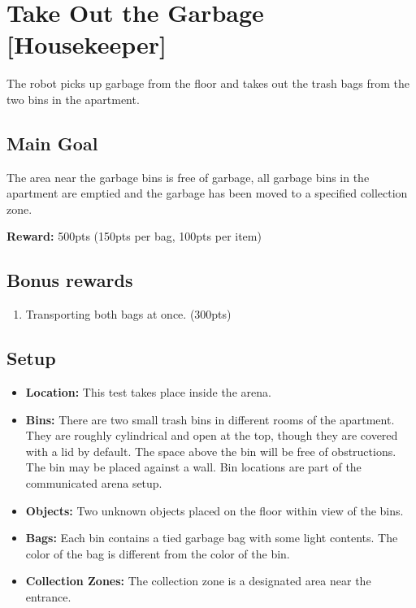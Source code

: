 \section{Take Out the Garbage [Housekeeper]}
\label{test:take-out-the-garbage}
The robot picks up garbage from the floor and takes out the trash bags from the two bins in the apartment.


\subsection*{Main Goal}
The area near the garbage bins is free of garbage, all garbage bins in the apartment are emptied and the garbage has been moved to a specified collection zone.


\noindent\textbf{Reward:} 500pts (150pts per bag, 100pts per item)

\subsection*{Bonus rewards}
\begin{enumerate}[nosep]
	\item Transporting both bags at once. (300pts)
\end{enumerate}

\subsection*{Setup}
\begin{itemize}[nosep]
	\item \textbf{Location:} This test takes place inside the arena.
	\item \textbf{Bins:} There are two small trash bins in different rooms of the apartment. They are roughly cylindrical and open at the top, though they are covered with a lid by default. The space above the bin will be free of obstructions. The bin may be placed against a wall. Bin locations are part of the communicated arena setup.
	\item \textbf{Objects:} Two unknown objects placed on the floor within view of the bins.
	\item \textbf{Bags:} Each bin contains a tied garbage bag with some light contents. The color of the bag is different from the color of the bin.
	\item \textbf{Collection Zones:} The collection zone is a designated area near the entrance.
\end{itemize}


